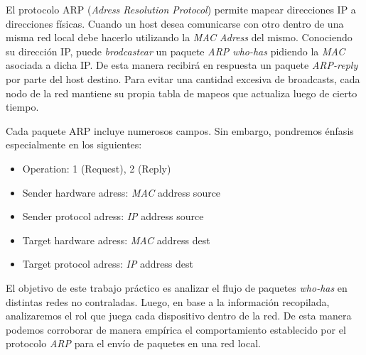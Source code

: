 El protocolo ARP (\emph{Adress Resolution Protocol}) permite mapear direcciones IP a direcciones
físicas. Cuando un host desea comunicarse con otro dentro de una misma red local debe hacerlo
utilizando la \emph{MAC Adress} del mismo. Conociendo su dirección IP, puede \emph{brodcastear} un
paquete \emph{ARP who-has} pidiendo la \emph{MAC} asociada a dicha IP. De esta manera recibirá en
respuesta un paquete \emph{ARP-reply} por parte del host destino.
Para evitar una cantidad excesiva de broadcasts, cada nodo de la red mantiene su propia tabla de
mapeos que actualiza luego de cierto tiempo.

Cada paquete ARP incluye numerosos campos. Sin embargo, pondremos énfasis especialmente en los 
siguientes:
\begin{itemize}
    \item Operation: 1 (Request), 2 (Reply)
    \item Sender hardware adress: \emph{MAC} address source
    \item Sender protocol adress: \emph{IP} address source
    \item Target hardware adress: \emph{MAC} address dest
    \item Target protocol adress: \emph{IP} address dest
\end{itemize}

El objetivo de este trabajo práctico es analizar el flujo de paquetes \emph{who-has} en distintas
redes no contraladas. Luego, en base a la informaci\'on recopilada, analizaremos el rol que juega
cada dispositivo dentro de la red. De esta manera podemos corroborar de manera empírica el 
comportamiento establecido por el protocolo \emph{ARP} para el envío de paquetes en una red local.  
